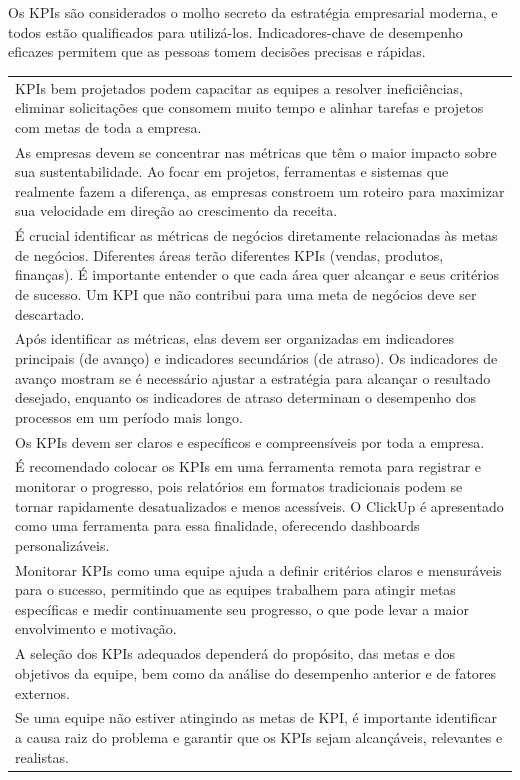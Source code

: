 \documentclass[
]{book}
\begin{document}
Os KPIs são considerados o molho secreto da estratégia empresarial moderna, e todos estão qualificados para utilizá-los. Indicadores-chave de desempenho eficazes permitem que as pessoas tomem decisões precisas e rápidas.

\begin{longtable}[]{@{}
  >{\raggedright\arraybackslash}p{}@{}}
\toprule\noalign{}
\endhead
\bottomrule\noalign{}
\endlastfoot
KPIs bem projetados podem capacitar as equipes a resolver ineficiências, eliminar solicitações que consomem muito tempo e alinhar tarefas e projetos com metas de toda a empresa. \\
As empresas devem se concentrar nas métricas que têm o maior impacto sobre sua sustentabilidade. Ao focar em projetos, ferramentas e sistemas que realmente fazem a diferença, as empresas constroem um roteiro para maximizar sua velocidade em direção ao crescimento da receita. \\
É crucial identificar as métricas de negócios diretamente relacionadas às metas de negócios. Diferentes áreas terão diferentes KPIs (vendas, produtos, finanças). É importante entender o que cada área quer alcançar e seus critérios de sucesso. Um KPI que não contribui para uma meta de negócios deve ser descartado. \\
Após identificar as métricas, elas devem ser organizadas em indicadores principais (de avanço) e indicadores secundários (de atraso). Os indicadores de avanço mostram se é necessário ajustar a estratégia para alcançar o resultado desejado, enquanto os indicadores de atraso determinam o desempenho dos processos em um período mais longo. \\
Os KPIs devem ser claros e específicos e compreensíveis por toda a empresa. \\
É recomendado colocar os KPIs em uma ferramenta remota para registrar e monitorar o progresso, pois relatórios em formatos tradicionais podem se tornar rapidamente desatualizados e menos acessíveis. O ClickUp é apresentado como uma ferramenta para essa finalidade, oferecendo dashboards personalizáveis. \\
Monitorar KPIs como uma equipe ajuda a definir critérios claros e mensuráveis para o sucesso, permitindo que as equipes trabalhem para atingir metas específicas e medir continuamente seu progresso, o que pode levar a maior envolvimento e motivação. \\
A seleção dos KPIs adequados dependerá do propósito, das metas e dos objetivos da equipe, bem como da análise do desempenho anterior e de fatores externos. \\
Se uma equipe não estiver atingindo as metas de KPI, é importante identificar a causa raiz do problema e garantir que os KPIs sejam alcançáveis, relevantes e realistas. \\
\end{longtable}
\end{document}
